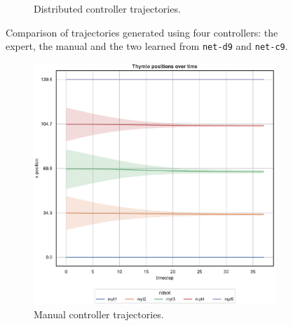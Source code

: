 \begin{figure}[H]
\begin{center}
\begin{subfigure}[h]{0.49\textwidth}
			\caption{Distributed controller trajectories.}
		\end{subfigure}
	\end{center}
	\vspace{-0.5cm}
	\caption[Evaluation of the trajectories learned by \texttt{net-c9}.]{Comparison 
	of trajectories generated using four controllers: the expert, the manual and the 
	two learned from \texttt{net-d9} and \texttt{net-c9}.}
\end{figure}

\medskip
\begin{figure}[!htb]\ContinuedFloat
	\begin{center}
		\begin{subfigure}[h]{0.49\textwidth}
			\centering			
			\includegraphics[width=\textwidth]{contents/images/net-d9/position-overtime-manual}%
			\caption{Manual controller trajectories.}
		\end{subfigure}
		\hfill
		\begin{subfigure}[h]{0.49\textwidth}
			\centering

\end{subfigure}
\end{center}
\end{figure}
